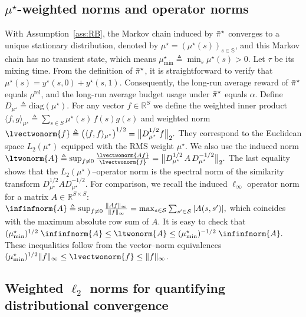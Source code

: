 \documentclass[mnsc,nonblindrev]{informs3}
\newcommand{\pibst}{\Bar{\pi}^\star}
\newcommand{\States}{\mathcal{S}}
\begin{document}
\begin{APPENDICES}
\subsection{\texorpdfstring{$\mu^\star$-weighted norms and operator norms}{μ*-weighted norms and operator norms}}\label{subsec:l2mustar-norm}
With Assumption~\ref{ass:RB}, the Markov chain induced by \( \pibst \) converges to a unique stationary distribution, denoted by \( \mu^\star = (\mu^\star(s))_{s \in \mathbb{S}} \), and this Markov chain has no transient state, which means $\mu^\star_{\min}\triangleq\min_{s}\mu^{\star}(s)>0$. Let  $\tau$ be its mixing time. From the definition of \( \pibst \), it is straightforward to verify that \( \mu^\star(s) = y^\star(s, 0) + y^\star(s, 1) \). Consequently, the long-run average reward of \( \pibst \) equals \( \rho^{\mathrm{rel}} \), and the long-run average budget usage under \( \pibst \) equals \( \alpha \). Define $D_{\mu^{\star}}\triangleq\mathrm{diag}(\mu^{\star})$.
For any vector $f\in\mathbb{R}^{S}$ we define the weighted inner product $\langle f,g\rangle_{\mu^{\star}}
\triangleq \sum_{s\in S}\mu^{\star}(s)\,f(s)g(s)$ and weighted norm $\lvectwonorm{f}
\triangleq \big(\langle f,f\rangle_{\mu^{\star}}\big)^{1/2} = \big\|D_{\mu^{\star}}^{1/2} f\big\|_{2}.$
They correspond to the Euclidean space $L_{2}(\mu^{\star})$ equipped with the RMS weight $\mu^{\star}$.
We also use the induced norm
$
    \ltwonorm{A}
    \triangleq \sup_{f\neq 0}\frac{\lvectwonorm{Af}}{\lvectwonorm{f}}
    = \big\|D_{\mu^{\star}}^{1/2}\,A\,D_{\mu^{\star}}^{-1/2}\big\|_{2}.
$
The last equality shows that the $L_{2}(\mu^{\star})$–operator norm is the spectral norm of
the similarity transform $D_{\mu^{\star}}^{1/2} A D_{\mu^{\star}}^{-1/2}$. 
For comparison, we recall the induced $\ell_\infty$ operator norm for a matrix $A \in \mathbb{R}^{S \times S}$: 
$
    \infinfnorm{A}
    \triangleq \sup_{f \neq 0} \frac{\|Af\|_\infty}{\|f\|_\infty}
    = \max_{s \in \States} \sum_{s' \in \States} |A(s,s')|,
$
which coincides with the maximum absolute row sum of $A$.
It is easy to check that 
$
    (\mu^\star_{\min})^{1/2}\; \infinfnorm{A}
    \le \ltwonorm{A}
    \le (\mu^\star_{\min})^{-1/2} \; \infinfnorm{A}.
$
These inequalities follow from the vector–norm equivalences
$(\mu^\star_{\min})^{1/2} \|f\|_{\infty} \le \lvectwonorm{f} \le \|f\|_{\infty}$. %

\subsection{\texorpdfstring{Weighted $\ell_2$ norms for quantifying distributional convergence}{Weighted l2 norms for quantifying distributional convergence}}
\label{subsec:weighted_L2}


\end{APPENDICES}
\end{document}
